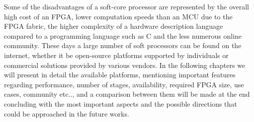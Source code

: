 Some of the disadvantages of a soft-core processor are represented by the overall high
cost of an FPGA, lower computation speeds than an MCU due to the FPGA fabric, the higher
complexity of a hardware description language compared to a programming language such as
C and the less numerous online community.
These days a large number of soft processors can be found on the internet, whether it be
open-source platforms supported by individuals or commercial solutions provided by various
vendors. In the following chapters we will present in detail the available platforms,
mentioning important features regarding performance, number of stages, availability,
required FPGA size, use cases, community etc.., and a comparison between them will be
made at the end concluding with the most important aspects and the possible directions that
could be approached in the future works.